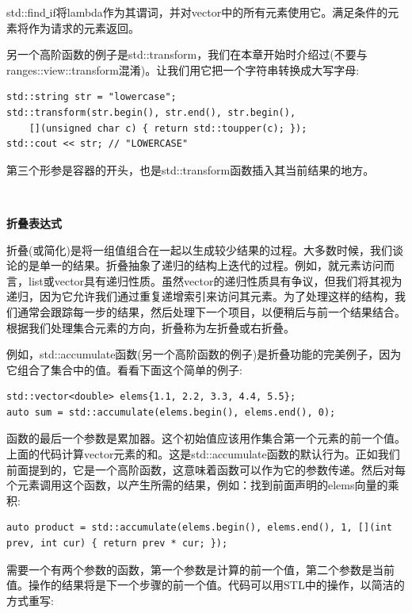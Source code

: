 std::find\underline{ }if将lambda作为其谓词，并对vector中的所有元素使用它。满足条件的元素将作为请求的元素返回。 \par
另一个高阶函数的例子是std::transform，我们在本章开始时介绍过(不要与ranges::view::transform混淆)。让我们用它把一个字符串转换成大写字母: \par

\begin{lstlisting}[caption={}]
std::string str = "lowercase";
std::transform(str.begin(), str.end(), str.begin(),
	[](unsigned char c) { return std::toupper(c); });
std::cout << str; // "LOWERCASE"
\end{lstlisting}

第三个形参是容器的开头，也是std::transform函数插入其当前结果的地方。 \par

\noindent\textbf{}\ \par
\textbf{折叠表达式} \ \par
折叠(或简化)是将一组值组合在一起以生成较少结果的过程。大多数时候，我们谈论的是单一的结果。折叠抽象了递归的结构上迭代的过程。例如，就元素访问而言，list或vector具有递归性质。虽然vector的递归性质具有争议，但我们将其视为递归，因为它允许我们通过重复递增索引来访问其元素。为了处理这样的结构，我们通常会跟踪每一步的结果，然后处理下一个项目，以便稍后与前一个结果结合。根据我们处理集合元素的方向，折叠称为左折叠或右折叠。 \par
例如，std::accumulate函数(另一个高阶函数的例子)是折叠功能的完美例子，因为它组合了集合中的值。看看下面这个简单的例子: \par

\begin{lstlisting}[caption={}]
std::vector<double> elems{1.1, 2.2, 3.3, 4.4, 5.5};
auto sum = std::accumulate(elems.begin(), elems.end(), 0);
\end{lstlisting}

函数的最后一个参数是累加器。这个初始值应该用作集合第一个元素的前一个值。上面的代码计算vector元素的和。这是std::accumulate函数的默认行为。正如我们前面提到的，它是一个高阶函数，这意味着函数可以作为它的参数传递。然后对每个元素调用这个函数，以产生所需的结果，例如：找到前面声明的elems向量的乘积: \par

\begin{lstlisting}[caption={}]
auto product = std::accumulate(elems.begin(), elems.end(), 1, [](int prev, int cur) { return prev * cur; });
\end{lstlisting}

需要一个有两个参数的函数，第一个参数是计算的前一个值，第二个参数是当前值。操作的结果将是下一个步骤的前一个值。代码可以用STL中的操作，以简洁的方式重写: \par

